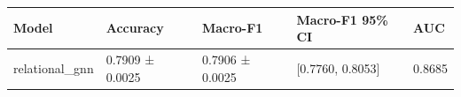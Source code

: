 \begin{tabular}{lllll}
\toprule
Model & Accuracy & Macro-F1 & Macro-F1 95\% CI & AUC \\
\midrule
relational\_gnn & 0.7909 ± 0.0025 & 0.7906 ± 0.0025 & [0.7760, 0.8053] & 0.8685 \\
\bottomrule
\end{tabular}
